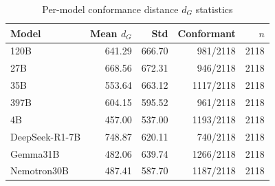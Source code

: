 \begin{table}[htbp]
\centering
\caption{Per-model conformance distance $d_G$ statistics}
\label{tab:exact_dg}
\begin{tabular}{lrrrr}
\toprule
Model & Mean $d_G$ & Std & Conformant & $n$ \\
\midrule
120B & 641.29 & 666.70 & 981/2118 & 2118 \\
27B & 668.56 & 672.31 & 946/2118 & 2118 \\
35B & 553.64 & 663.12 & 1117/2118 & 2118 \\
397B & 604.15 & 595.52 & 961/2118 & 2118 \\
4B & 457.00 & 537.00 & 1193/2118 & 2118 \\
DeepSeek-R1-7B & 748.87 & 620.11 & 740/2118 & 2118 \\
Gemma31B & 482.06 & 639.74 & 1266/2118 & 2118 \\
Nemotron30B & 487.41 & 587.70 & 1187/2118 & 2118 \\
\bottomrule
\end{tabular}
\end{table}
